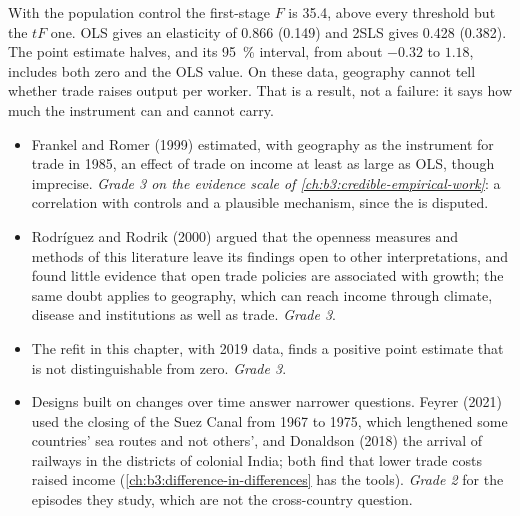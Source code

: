 \label{lst:b3:instrumental-variables:geography}

\label{out:b3:instrumental-variables:geography}

With the population control the first-stage $F$ is 35.4, above every
threshold but the $tF$ one. OLS gives an elasticity of 0.866 (0.149) and 2SLS
gives 0.428 (0.382). %
The point estimate halves, and its 95~\% interval, from about $-0.32$ to
$1.18$, includes both zero and the OLS value. On these data, geography cannot
tell whether trade raises output per worker. That is a result, not a failure:
it says how much the instrument can and cannot carry.

\begin{debate}
\begin{itemize}
\item Frankel and Romer (1999) estimated, with geography as the instrument for
trade in 1985, an effect of trade on income at least as large as OLS, though
imprecise. %
\emph{Grade 3 on the evidence scale of
\cref{ch:b3:credible-empirical-work}}: a correlation with controls and a
plausible mechanism, since the  is disputed.
\item Rodríguez and Rodrik (2000) argued that the openness measures and
methods of this literature leave its findings open to other interpretations,
and found little evidence that open trade policies are associated with
growth; the same doubt applies to geography, which can reach income through
climate, disease and institutions as well as trade. \emph{Grade 3}. %
\item The refit in this chapter, with 2019 data, finds a positive point
estimate that is not distinguishable from zero. \emph{Grade 3}.
\item Designs built on changes over time answer narrower questions. Feyrer
(2021) used the closing of the Suez Canal from 1967 to 1975, which lengthened
some countries' sea routes and not others', and Donaldson (2018) the arrival of
railways in the districts of colonial India; both find that lower trade costs
raised income (\cref{ch:b3:difference-in-differences} has the tools). %
\emph{Grade 2} for the episodes they study, which are not the cross-country
question.
\end{itemize}
\end{debate}

